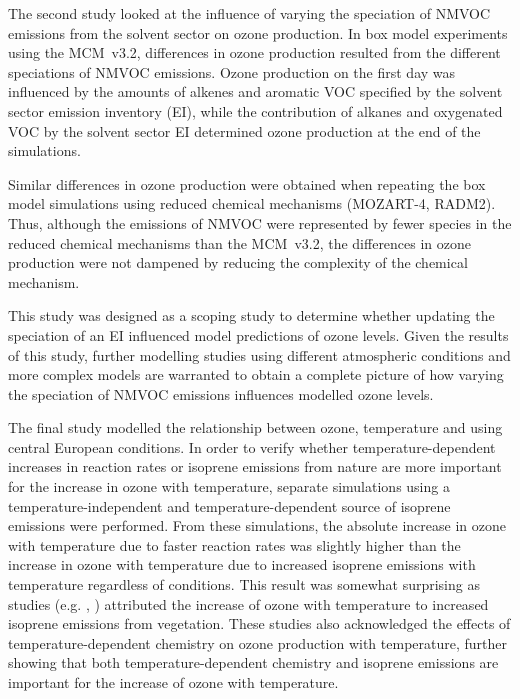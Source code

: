 The second study looked at the influence of varying the speciation of NMVOC emissions from the solvent sector on ozone production.
In box model experiments using the MCM~v3.2, differences in ozone production resulted from the different speciations of NMVOC emissions.
Ozone production on the first day was influenced by the amounts of alkenes and aromatic VOC specified by the solvent sector emission inventory (EI), while the contribution of alkanes and oxygenated VOC by the solvent sector EI determined ozone production at the end of the simulations.

Similar differences in ozone production were obtained when repeating the box model simulations using reduced chemical mechanisms (MOZART-4, RADM2).
Thus, although the emissions of NMVOC were represented by fewer species in the reduced chemical mechanisms than the MCM~v3.2, the differences in ozone production were not dampened by reducing the complexity of the chemical mechanism.

This study was designed as a scoping study to determine whether updating the speciation of an EI influenced model predictions of ozone levels.
Given the results of this study, further modelling studies using different atmospheric conditions and more complex models are warranted to obtain a complete picture of how varying the speciation of NMVOC emissions influences modelled ozone levels.

The final study modelled the relationship between ozone, temperature and  using central European conditions.
In order to verify whether temperature-dependent increases in reaction rates or isoprene emissions from nature are more important for the increase in ozone with temperature, separate simulations using a temperature-independent and temperature-dependent source of isoprene emissions were performed.
From these simulations, the absolute increase in ozone with temperature due to faster reaction rates was slightly higher than the increase in ozone with temperature due to increased isoprene emissions with temperature regardless of  conditions.
This result was somewhat surprising as studies (e.g. \citet{Racherla:2008}, \citet{Doherty:2013}) attributed the increase of ozone with temperature to increased isoprene emissions from vegetation.
These studies also acknowledged the effects of temperature-dependent chemistry on ozone production with temperature, further showing that both temperature-dependent chemistry and isoprene emissions are important for the increase of ozone with temperature.

